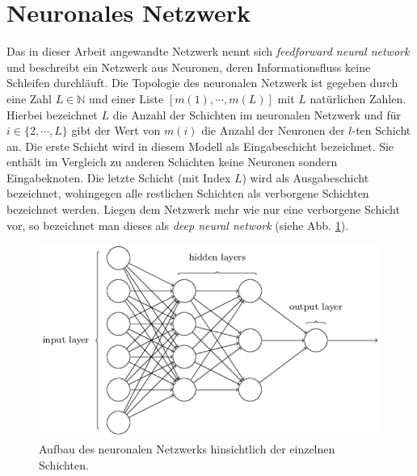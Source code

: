 \section{Neuronales Netzwerk}
Das in dieser Arbeit angewandte Netzwerk nennt sich \textit{feedforward neural network} und beschreibt ein Netzwerk aus Neuronen, deren Informationsfluss keine Schleifen durchläuft. Die Topologie des neuronalen Netzwerk ist gegeben durch eine Zahl $L \in \mathbb{N}$ und einer Liste $[m(1),\cdots ,m(L)]$ mit $L$ natürlichen Zahlen. Hierbei bezeichnet $L$ die Anzahl der Schichten im neuronalen Netzwerk und für $i \in \{2,\cdots ,L\}$ gibt der Wert von $m(i)$ die Anzahl der Neuronen der $l$-ten Schicht an. Die erste Schicht wird in diesem Modell als Eingabeschicht bezeichnet. Sie enthält im Vergleich zu anderen Schichten keine Neuronen sondern Eingabeknoten. Die letzte Schicht (mit Index $L$) wird als Ausgabeschicht bezeichnet, wohingegen alle restlichen Schichten als verborgene Schichten bezeichnet werden. Liegen dem Netzwerk mehr wie nur eine verborgene Schicht vor, so bezeichnet man dieses als \textit{deep neural network} (siehe Abb. \ref{fig:neural_network_extended}).
\begin{figure}[hbt]
	\centering
	\includegraphics[scale=0.6]{Bilder/neural_network_extended}
	\caption{Aufbau des neuronalen Netzwerks hinsichtlich der einzelnen Schichten. \cite{nielson:2017}} 
	\label{fig:neural_network_extended} 
\end{figure}


